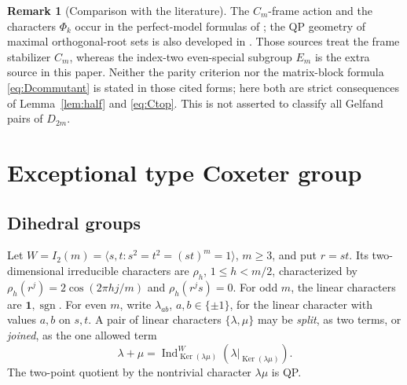\documentclass[11pt]{article}
\numberwithin{equation}{section}
\theoremstyle{definition}
\newtheorem{remark}[theorem]{Remark}
\DeclareMathOperator{\Ind}{Ind}
\DeclareMathOperator{\sgn}{sgn}
\DeclareMathOperator{\Ker}{Ker}
\newcommand{\one}{\mathbf 1}
\begin{document}
\begin{remark}[Comparison with the literature]
The \(C_m\)-frame action and the characters \(\Phi_k\) occur in the
perfect-model formulas of \cite{MZgraphs,MZperfect}; the QP geometry of
maximal orthogonal-root sets is also developed in \cite{GXroots}.
Those sources treat the frame stabilizer \(C_m\), whereas the
index-two even-special subgroup \(E_m\) is the extra source in this
paper.  Neither the parity criterion nor the matrix-block formula
\eqref{eq:Dcommutant} is stated in those cited forms; here both are
strict consequences of Lemma~\ref{lem:half} and \eqref{eq:Ctop}.
This is not asserted to classify all Gelfand pairs of \(D_{2m}\).
\end{remark}
\section{Exceptional type Coxeter group}
\label{sec:exceptional}

\subsection{Dihedral groups}

Let
\(W=I_2(m)=\langle s,t:s^2=t^2=(st)^m=1\rangle\), \(m\geq3\), and put \(r=st\).
Its two-dimensional irreducible characters are \(\rho_h\), \(1\leq h<m/2\), characterized by
\(\rho_h(r^j)=2\cos(2\pi hj/m)\) and \(\rho_h(r^js)=0\).
For odd \(m\), the linear characters are \(\one,\sgn\).
For even \(m\), write \(\lambda_{ab}\), \(a,b\in\{\pm1\}\), for the linear character with values \(a,b\) on \(s,t\).
A pair of linear characters \(\{\lambda,\mu\}\) may be \emph{split}, as two terms, or \emph{joined}, as the one allowed term
\[
 \lambda+\mu=\Ind_{\Ker(\lambda\mu)}^W(\lambda|_{\Ker(\lambda\mu)}).
\]
The two-point quotient by the nontrivial character \(\lambda\mu\) is QP.
\end{document}

